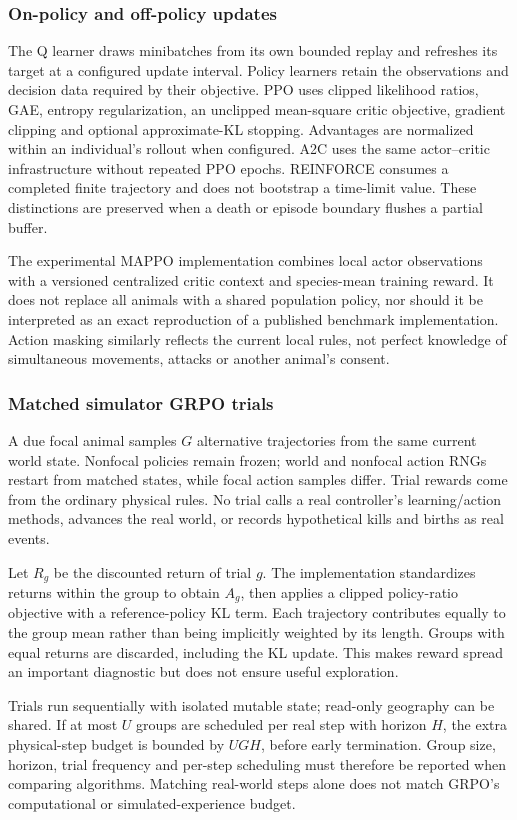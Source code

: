 \subsubsection{On-policy and off-policy updates}
The Q learner draws minibatches from its own bounded replay and refreshes its
target at a configured update interval. Policy learners retain the observations
and decision data required by their objective. PPO uses clipped likelihood
ratios, GAE, entropy regularization, an unclipped mean-square critic objective,
gradient clipping and optional approximate-KL stopping. Advantages are normalized
within an individual's rollout when configured. A2C uses the same actor--critic
infrastructure without repeated PPO epochs. REINFORCE consumes a completed finite
trajectory and does not bootstrap a time-limit value. These distinctions are
preserved when a death or episode boundary flushes a partial buffer.

The experimental MAPPO implementation combines local actor observations with a
versioned centralized critic context and species-mean training reward. It does
not replace all animals with a shared population policy, nor should it be
interpreted as an exact reproduction of a published benchmark implementation.
Action masking similarly reflects the current local rules, not perfect
knowledge of simultaneous movements, attacks or another animal's consent.

\subsubsection{Matched simulator GRPO trials}
A due focal animal samples $G$ alternative trajectories from the same current
world state. Nonfocal policies remain frozen; world and nonfocal action RNGs
restart from matched states, while focal action samples differ. Trial rewards
come from the ordinary physical rules. No trial calls a real controller's
learning/action methods, advances the real world, or records hypothetical kills
and births as real events.

Let $R_g$ be the discounted return of trial $g$. The implementation standardizes
returns within the group to obtain $A_g$, then applies a clipped policy-ratio
objective with a reference-policy KL term. Each trajectory contributes equally
to the group mean rather than being implicitly weighted by its length. Groups
with equal returns are discarded, including the KL update. This makes reward
spread an important diagnostic but does not ensure useful exploration.

Trials run sequentially with isolated mutable state; read-only geography can be
shared. If at most $U$ groups are scheduled per real step with horizon $H$,
the extra physical-step budget is bounded by $UGH$, before early termination.
Group size, horizon, trial frequency and per-step scheduling must therefore be
reported when comparing algorithms. Matching real-world steps alone does not
match GRPO's computational or simulated-experience budget.
